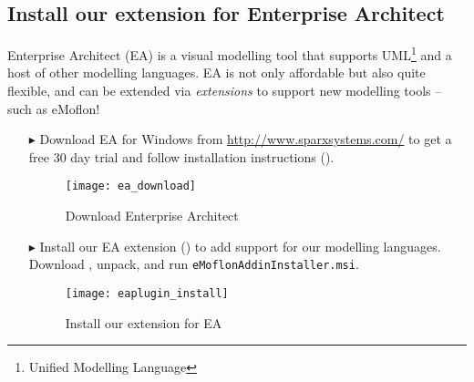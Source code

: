 \newpage

\genHeader
\subsection{Install our extension for Enterprise Architect}

Enterprise Architect (EA) is a visual modelling tool that supports UML\footnote{Unified Modelling Language} and a host of other modelling languages.
EA is not only affordable but also quite flexible, and can be extended via \emph{extensions} to support new modelling tools -- such as eMoflon!

\begin{itemize}
\item[$\blacktriangleright$] Download\hypertarget{installEA vis}{} EA for Windows from \url{http://www.sparxsystems.com/} to get a free 30 day trial and follow
installation instructions ().

\begin{figure}[htbp]
	\centering
  	\texttt{[image: ea\_download]}
	\caption{Download Enterprise Architect}
	\label{enterpriseArchitextHomepage}
\end{figure} 

\item[$\blacktriangleright$] Install our EA extension () to add support for our modelling languages.
Download \eMoflonEAAddin, unpack, and run \texttt{eMoflonAddinInstaller.msi}.

\begin{figure}[htbp]
	\centering
  \texttt{[image: eaplugin\_install]}
	\caption{Install our extension for EA}
	\label{eaPluginWizard}
\end{figure}
\end{itemize}